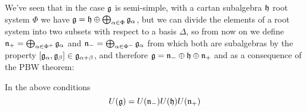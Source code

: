We've seen that in the case $\mathfrak{g}$ is semi-simple, with a cartan subalgebra $\mathfrak{h}$ root system $\Phi$ we have $\mathfrak{g} = \mathfrak{h} \oplus \bigoplus_{\alpha \in \Phi} \mathfrak{g}_\alpha$, but we can divide the elements of a root system into two subsets with respect to a basis $\Delta$, so from now on we define $\mathfrak{n}_+ = \bigoplus_{\alpha \in \Phi^{+}}\mathfrak{g}_\alpha$ and $\mathfrak{n}_{-}=\bigoplus_{\alpha \in \Phi^{-}}\mathfrak{g}_\alpha$ from which both are subalgebras by the property $[\mathfrak{g}_\alpha,\mathfrak{g}_\beta]\in \mathfrak{g}_{\alpha+\beta}$, and therefore $\mathfrak{g} = \mathfrak{n}_- \oplus \mathfrak{h} \oplus \mathfrak{n}_+$ and as a consequence of the PBW theorem:
\begin{corol}
In the above conditions
$$U(\mathfrak{g}) = U(\mathfrak{n}_-)U(\mathfrak{h})U(\mathfrak{n}_+)$$	
\end{corol}